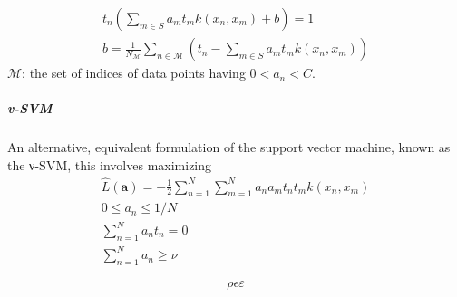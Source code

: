 \documentclass[a4paper]{article}
\begin{document}
\begin{align}
t_n(\sum_{m \in S} a_mt_mk(x_n,x_m)+b) = 1\\
b = \frac{1}{N_{\mathcal{M}}} \sum_{n \in \mathcal{M}} (t_n - \sum_{m \in S} a_mt_mk(x_n,x_m))
\end{align}
$\mathcal{M}$: the set of indices of data points having $0 < a_n < C$.

\subparagraph{v-SVM}
An alternative, equivalent formulation of the support vector machine, known as the ν-SVM, this involves maximizing
\begin{align}
\widehat{L}(\mathbf{a}) = - \frac{1}{2} \sum_{n=1}^N\sum_{m=1}^N a_na_mt_nt_mk(x_n,x_m)\\
0 \leq a_n \leq 1/N\\
\sum_{n=1}^N a_nt_n = 0\\
\sum_{n=1}^N a_n \geq \nu
\end{align}

\[
\rho
\epsilon
\varepsilon
\]
\end{document}
